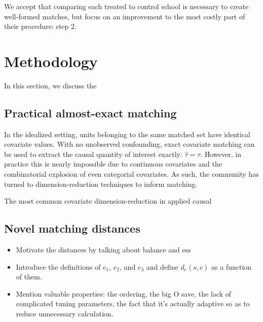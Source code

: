 \documentclass[aoas]{imsart}
\theoremstyle{plain}
\theoremstyle{definition}
\begin{document}
We accept that comparing each treated to control school is necessary to create well-formed matches, but focus on an improvement to the most costly part of their procedure: step 2.


\section{Methodology}
In this section, we discuss the 


\subsection{Practical almost-exact matching}

In the idealized setting, units belonging to the same matched set have identical covariate values. With no unobserved confounding, exact covariate matching can be used to extract the causal quantity of interest exactly: $\hat{\tau} = \tau$. However, in practice this is nearly impossible due to continuous covariates and the combinatorial explosion of even categorial covariates. As such, the community has turned to dimension-reduction techniques to inform matching.  

The most common covariate dimension-reduction in applied causal 





\subsection{Novel matching distances}

\begin{itemize}
  \item Motivate the distances by talking about balance and ess
  \item Introduce the definitions of $e_1$, $e_2$, and $e_3$ and define $d_e(s, c)$ as a function of them.
  \item Mention valuable properties: the ordering, the big O save, the lack of complicated tuning parameters, the fact that it's actually adaptive so as to reduce unnecessary calculation.
\end{itemize}
\end{document}
